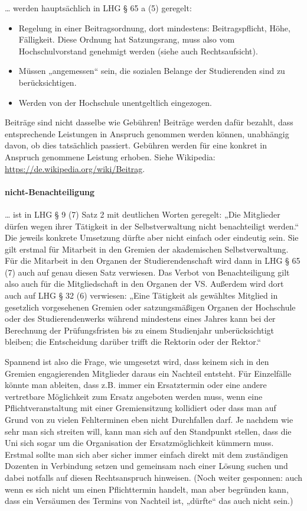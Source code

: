 \documentclass[
10pt,
a4paper,
twoside,								%
titlepage=false,							%
draft=false								%
]{scrartcl}
\begin{document}
… werden hauptsächlich in LHG § 65 a (5) geregelt:
\begin{itemize}
	\item Regelung in einer Beitragsordnung, dort mindestens: Beitragspflicht, Höhe, Fälligkeit. Diese Ordnung hat Satzungsrang, muss also vom Hochschulvorstand genehmigt werden (siehe auch Rechtsaufsicht).
	\item Müssen „angemessen“ sein, die sozialen Belange der Studierenden sind zu berücksichtigen.
	\item Werden von der Hochschule unentgeltlich eingezogen.
\end{itemize}
Beiträge sind nicht dasselbe wie Gebühren! Beiträge werden dafür bezahlt, dass entsprechende Leistungen in Anspruch genommen werden können, unabhängig davon, ob dies tatsächlich passiert. Gebühren werden für eine konkret in Anspruch genommene Leistung erhoben. Siehe Wikipedia: \url{https://de.wikipedia.org/wiki/Beitrag}.



\paragraph{nicht-Benachteiligung}\label{Glossar: nicht-Benachteiligung}

… ist in LHG § 9 (7) Satz 2 mit deutlichen Worten geregelt: „Die Mitglieder dürfen wegen ihrer Tätigkeit in der Selbstverwaltung nicht benachteiligt werden.“ Die jeweils konkrete Umsetzung dürfte aber nicht einfach oder eindeutig sein. Sie gilt erstmal für Mitarbeit in den Gremien der akademischen Selbstverwaltung. Für die Mitarbeit in den Organen der Studierendenschaft wird dann in LHG § 65 (7) auch auf genau diesen Satz verwiesen. Das Verbot von Benachteiligung gilt also auch für die Mitgliedschaft in den Organen der VS. Außerdem wird dort auch auf LHG § 32 (6) verwiesen: „Eine Tätigkeit als gewähltes Mitglied in gesetzlich vorgesehenen Gremien oder satzungsmäßigen Organen der Hochschule oder des Studierendenwerks während mindestens eines Jahres kann bei der Berechnung der Prüfungsfristen bis zu einem Studienjahr unberücksichtigt bleiben; die Entscheidung darüber trifft die Rektorin oder der Rektor.“

Spannend ist also die Frage, wie umgesetzt wird, dass keinem sich in den Gremien engagierenden Mitglieder daraus ein Nachteil entsteht. Für Einzelfälle könnte man ableiten, dass z.B. immer ein Ersatztermin oder eine andere vertretbare Möglichkeit zum Ersatz angeboten werden muss, wenn eine Pflichtveranstaltung mit einer Gremiensitzung kollidiert oder dass man auf Grund von zu vielen Fehlterminen eben nicht Durchfallen darf. Je nachdem wie sehr man sich streiten will, kann man sich auf den Standpunkt stellen, dass die Uni sich sogar um die Organisation der Ersatzmöglichkeit kümmern muss. Erstmal sollte man sich aber sicher immer einfach direkt mit dem zuständigen Dozenten in Verbindung setzen und gemeinsam nach einer Lösung suchen und dabei notfalls auf diesen Rechtsanspruch hinweisen. (Noch weiter gesponnen: auch wenn es sich nicht um einen Pflichttermin handelt, man aber begründen kann, dass ein Versäumen des Termins von Nachteil ist, „dürfte“ das auch nicht sein.)
\end{document}
